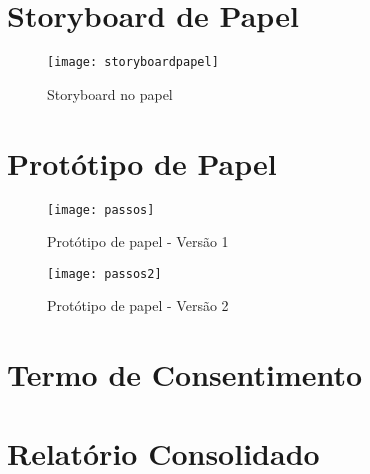 \begin{apendicesenv}

\partapendices
\chapter{Storyboard de Papel}

\begin{figure}[!htb]
 \centering
 \texttt{[image: storyboardpapel]}
 \caption{Storyboard no papel}
 \label{Rotulo}

\end{figure}

\chapter{Protótipo de Papel}

\begin{figure}[!htb]
 \centering
 \texttt{[image: passos]}
 \caption{Protótipo de papel - Versão 1}
 \label{Rotulo}

\end{figure}

\begin{figure}[!htb]
 \centering
 \texttt{[image: passos2]}
 \caption{Protótipo de papel - Versão 2}
 \label{Rotulo}

\end{figure}

\chapter{Termo de Consentimento}

  

\chapter{Relatório Consolidado}

  
  

  \end{apendicesenv}

